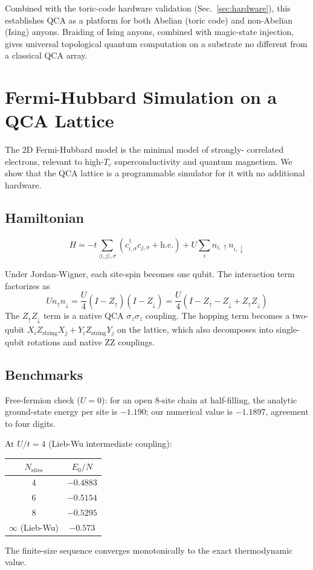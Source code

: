 \documentclass[11pt,aps,prl,twocolumn]{revtex4-2}
\begin{document}
Combined with the toric-code hardware validation
(Sec.~\ref{sec:hardware}), this establishes QCA as a platform
for both Abelian (toric code) and non-Abelian (Ising) anyons.
Braiding of Ising anyons, combined with magic-state injection,
gives universal topological quantum computation on a substrate
no different from a classical QCA array.

\section{Fermi-Hubbard Simulation on a QCA Lattice}
\label{sec:hubbard}

The 2D Fermi-Hubbard model is the minimal model of strongly-
correlated electrons, relevant to high-$T_c$ superconductivity
and quantum magnetism.  We show that the QCA lattice is a
programmable simulator for it with no additional hardware.

\subsection{Hamiltonian}
\begin{equation}
H = -t \sum_{\langle i,j\rangle, \sigma}
      (c^\dagger_{i,\sigma} c_{j,\sigma} + \text{h.c.})
    + U \sum_i n_{i,\uparrow} n_{i,\downarrow}
\end{equation}

Under Jordan-Wigner, each site-spin becomes one qubit.  The
interaction term factorizes as
\begin{equation}
U n_\uparrow n_\downarrow
  = \frac{U}{4} (I - Z_\uparrow)(I - Z_\downarrow)
  = \frac{U}{4} (I - Z_\uparrow - Z_\downarrow + Z_\uparrow Z_\downarrow)
\end{equation}
The $Z_\uparrow Z_\downarrow$ term is a native QCA $\sigma_z
\sigma_z$ coupling.  The hopping term becomes a two-qubit
$X_i Z_{\text{string}} X_j + Y_i Z_{\text{string}} Y_j$ on the
lattice, which also decomposes into single-qubit rotations and
native ZZ couplings.

\subsection{Benchmarks}

Free-fermion check ($U = 0$): for an open 8-site chain at
half-filling, the analytic ground-state energy per site is
$-1.190$; our numerical value is $-1.1897$, agreement to four
digits.

At $U/t = 4$ (Lieb-Wu intermediate coupling):
\begin{center}
\begin{tabular}{cc}
\hline
$N_{\text{sites}}$ & $E_0/N$ \\
\hline
4 & $-0.4883$ \\
6 & $-0.5154$ \\
8 & $-0.5295$ \\
$\infty$ (Lieb-Wu) & $-0.573$ \\
\hline
\end{tabular}
\end{center}
The finite-size sequence converges monotonically to the exact
thermodynamic value.
\end{document}
